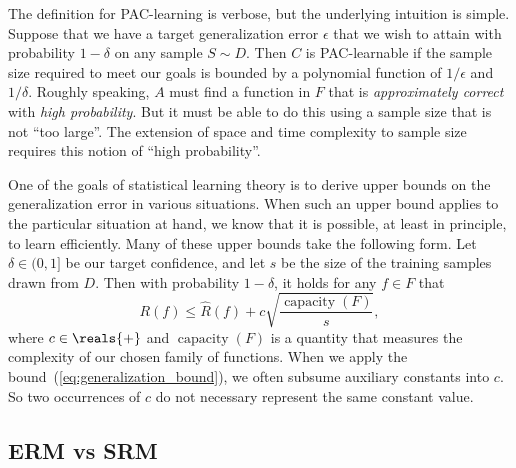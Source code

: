\documentclass[11pt,a4paper]{article}
\numberwithin{equation}{section}
\newcommand{\capacity}{\operatorname{capacity}}
\begin{document}
The definition for PAC-learning is verbose, but the underlying intuition is
simple. Suppose that we have a target generalization error $\epsilon$ that we
wish to attain with probability $1 - \delta$ on any sample $S \sim D$. Then $C$
is PAC-learnable if the sample size required to meet our goals is bounded by a
polynomial function of $1/\epsilon$ and $1/\delta$. Roughly speaking, $A$ must
find a function in $F$ that is \emph{approximately correct} with \emph{high
probability}. But it must be able to do this using a sample size that is not
``too large''. The extension of space and time complexity to sample size
requires this notion of ``high probability''.

One of the goals of statistical learning theory is to derive upper bounds on the
generalization error in various situations. When such an upper bound applies to
the particular situation at hand, we know that it is possible, at least in
principle, to learn efficiently. Many of these upper bounds take the following
form. Let $\delta \in (0, 1]$ be our target confidence, and let $s$ be the size
of the training samples drawn from $D$. Then with probability $1 - \delta$, it
holds for any $f \in F$ that
\begin{equation}
	R(f) \leq \hat{R}(f) + c \sqrt{\frac{\capacity(F)}{s}},
	\label{eq:generalization_bound}
\end{equation}
where $c \in \reals{+}$ and $\capacity(F)$ is a quantity that measures the
complexity of our chosen family of functions. When we apply the
bound~(\ref{eq:generalization_bound}), we often subsume auxiliary constants into
$c$. So two occurrences of $c$ do not necessary represent the same constant
value.

\subsection{ERM vs SRM}
\end{document}
